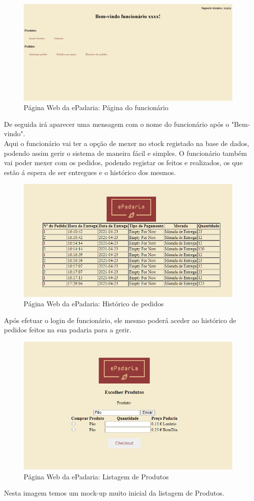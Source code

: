 \begin{figure}[H]
	\centering
	\includegraphics[width=15cm]{"mockup page func"}
	\caption{Página Web da ePadaria: Página do funcionário}
	\label{fig:mockup-page-func}
\end{figure}

De seguida irá aparecer uma mensagem com o nome do funcionário após o "Bem-vindo".\\
Aqui o funcionário vai ter a opção de mexer no stock registado na base de dados, podendo assim gerir o sistema de maneira fácil e simples.
O funcionário também vai poder mexer com os pedidos, podendo registar os feitos e realizados, os que estão á espera de ser entregues e o histórico dos mesmos.\\

\begin{figure}[H]
	\centering
	\includegraphics[width=15cm]{produtos33}
	\caption{Página Web da ePadaria: Histórico de pedidos }
	\label{fig:produtos33}
\end{figure}
Após efetuar o login de funcionário, ele mesmo poderá aceder ao histórico de pedidos feitos na sua padaria para a gerir.

\begin{figure}[H]
	\centering
	\includegraphics[width=15cm]{produtos2}
	\caption{Página Web da ePadaria: Listagem de Produtos}
	\label{fig:produtos2}
\end{figure}
Nesta imagem temos um mock-up muito inicial da listagem de Produtos.